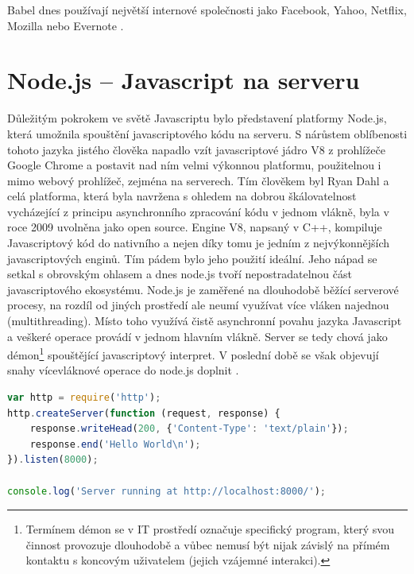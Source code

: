 Babel dnes používají největší internové společnosti jako Facebook, Yahoo, Netflix, Mozilla nebo Evernote \cite{babel}.

\section{Node.js – Javascript na serveru}
\label{sec:node_js}
Důležitým pokrokem ve světě Javascriptu bylo představení platformy Node.js, která umožnila spouštění javascriptového kódu na serveru. S nárůstem oblíbenosti tohoto jazyka jistého člověka napadlo vzít javascriptové jádro V8 z prohlížeče Google Chrome a postavit nad ním velmi výkonnou platformu, použitelnou i mimo webový prohlížeč, zejména na serverech. Tím člověkem byl Ryan Dahl a celá platforma, která byla navržena s ohledem na dobrou škálovatelnost vycházející z principu asynchronního zpracování kódu v jednom vlákně, byla v roce 2009 uvolněna jako open source. Engine V8, napsaný v C++, kompiluje Javascriptový kód do nativního a nejen díky tomu je jedním z nejvýkonnějších javascriptových enginů. Tím pádem bylo jeho použití ideální. Jeho nápad se setkal s obrovským ohlasem a dnes node.js tvoří nepostradatelnou část javascriptového ekosystému. Node.js je zaměřené na dlouhodobě běžící serverové procesy, na rozdíl od jiných prostředí ale neumí využívat více vláken najednou (multithreading). Místo toho využívá čistě asynchronní povahu jazyka Javascript a veškeré operace provádí v jednom hlavním vlákně. Server se tedy chová jako démon\footnote{Termínem démon se v IT prostředí označuje specifický program, který svou činnost provozuje dlouhodobě a vůbec nemusí být nijak závislý na přímém kontaktu s koncovým uživatelem (jejich vzájemné interakci).} spouštějící javascriptový interpret. V poslední době se však objevují snahy vícevláknové operace do node.js doplnit \cite{nodejs} \cite{glover_nodejs} \cite{tilkov_nodejs}.

\begin{lstlisting}[language=Javascript,caption=Ukázka kompletní implementace programu Hello World v node.js]
var http = require('http');
http.createServer(function (request, response) {
    response.writeHead(200, {'Content-Type': 'text/plain'});
    response.end('Hello World\n');
}).listen(8000);

console.log('Server running at http://localhost:8000/');
\end{lstlisting}

